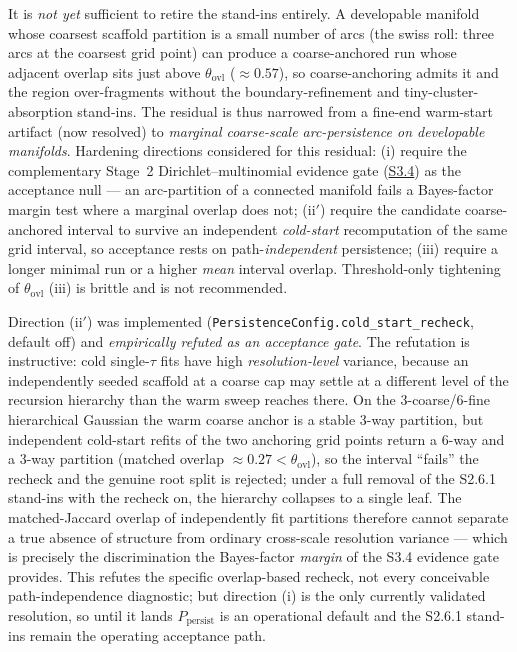 \documentclass[11pt]{article}
\begin{document}
It is \emph{not yet} sufficient to retire the stand-ins entirely. A developable
manifold whose coarsest scaffold partition is a small number of arcs (the swiss
roll: three arcs at the coarsest grid point) can produce a coarse-anchored run
whose adjacent overlap sits just above $\theta_{\mathrm{ovl}}$ ($\approx0.57$),
so coarse-anchoring admits it and the region over-fragments without the
boundary-refinement and tiny-cluster-absorption stand-ins. The residual is thus
narrowed from a fine-end warm-start artifact (now resolved) to \emph{marginal
coarse-scale arc-persistence on developable manifolds}. Hardening directions
considered for this residual: (i) require the complementary Stage~2
Dirichlet--multinomial evidence gate (\hyperref[sec:si-dm-evidence]{S3.4}) as the
acceptance null --- an arc-partition of a connected manifold fails a Bayes-factor
margin test where a marginal overlap does not; (ii$'$) require the candidate
coarse-anchored interval to survive an independent \emph{cold-start}
recomputation of the same grid interval, so acceptance rests on
path-\emph{independent} persistence; (iii) require a longer minimal run or a
higher \emph{mean} interval overlap. Threshold-only tightening of
$\theta_{\mathrm{ovl}}$ (iii) is brittle and is not recommended.

Direction (ii$'$) was implemented (\texttt{PersistenceConfig.cold\_start\_recheck},
default off) and \emph{empirically refuted as an acceptance gate}. The
refutation is instructive: cold single-$\tau$ fits have high
\emph{resolution-level} variance, because an independently seeded scaffold at a
coarse cap may settle at a different level of the recursion hierarchy than the
warm sweep reaches there. On the $3$-coarse/$6$-fine hierarchical Gaussian the
warm coarse anchor is a stable $3$-way partition, but independent cold-start
refits of the two anchoring grid points return a $6$-way and a $3$-way partition
(matched overlap $\approx0.27<\theta_{\mathrm{ovl}}$), so the interval ``fails''
the recheck and the genuine root split is rejected; under a full removal of the
S2.6.1 stand-ins with the recheck on, the hierarchy collapses to a single leaf.
The matched-Jaccard overlap of independently fit partitions therefore cannot
separate a true absence of structure from ordinary cross-scale resolution
variance --- which is precisely the discrimination the Bayes-factor \emph{margin}
of the S3.4 evidence gate provides. This refutes the specific overlap-based
recheck, not every conceivable path-independence diagnostic; but direction (i)
is the only currently validated resolution, so until it lands
$P_{\mathrm{persist}}$ is an operational default and the S2.6.1 stand-ins remain
the operating acceptance path.
\end{document}
